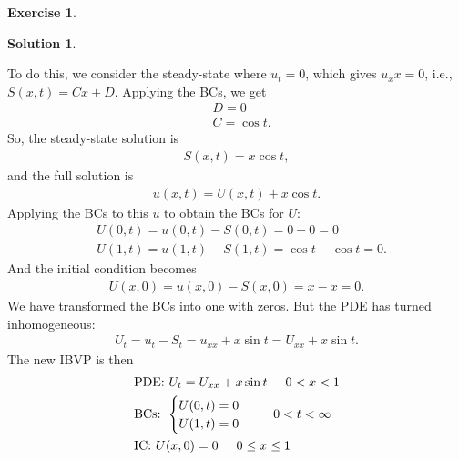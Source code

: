 \documentclass{article}
\theoremstyle{definition}
\newtheorem*{exer*}{Exercise}
\newtheorem*{sln*}{Solution}
\begin{document}
\begin{exer*}
\begin{sln*}
\begin{enumerate}
			To do this, we consider the steady-state where $u_t = 0$, which gives $u_xx = 0$, i.e., $S(x,t) = Cx+D$. Applying the BCs, we get
			\begin{align*}
			&D = 0\\
			&C = \cos t.
			\end{align*}
			So, the steady-state solution is 
			\begin{align*}
			S(x,t) = x\cos t,
			\end{align*}
			and the full solution is
			\begin{align*}
			u(x,t) = U(x,t) + x\cos t.
			\end{align*}
			Applying the BCs to this $u$ to obtain the BCs for $U$:
			\begin{align*}
			&U(0,t) = u(0,t) - S(0,t) = 0-0 = 0\\
			&U(1,t) = u(1,t) - S(1,t) = \cos t - \cos t = 0.
			\end{align*}
			And the initial condition becomes
			\begin{align*}
			U(x,0) = u(x,0) - S(x,0) = x - x = 0.
			\end{align*}
			We have transformed the BCs into one with zeros. But the PDE has turned inhomogeneous: 
			\begin{align*}
			U_t = u_t - S_t = u_{xx} + x\sin t = U_{xx} + x\sin t.
			\end{align*}
			The new IBVP is then
			\begin{align*}
			&\text{PDE: } U_t = U_{xx} + x\sin t \hspace{0.5cm} 0 < x < 1\\
			&\text{BCs: } \begin{cases}
			U(0,t) = 0\\
			U(1,t) = 0
			\end{cases}\hspace{0.5cm} 0 < t < \infty\\
			&\text{IC: } U(x,0) = 0\hspace{0.5cm}0\leq x\leq 1
			\end{align*}
			$\,$\\
			
			
			

\end{enumerate}
\end{sln*}
\end{exer*}
\end{document}
